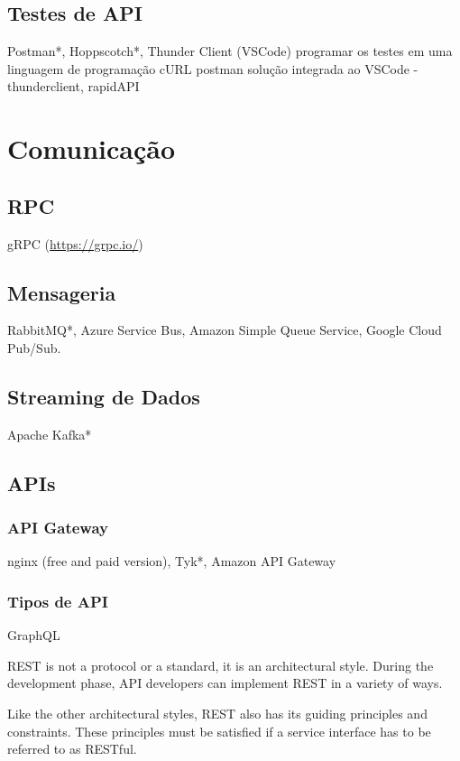\subsection{Testes de API}\label{ferramentas-testes-apis}
Postman*, Hoppscotch*, Thunder Client (VSCode)
programar os testes em uma linguagem de programação
cURL
postman
solução integrada ao VSCode - thunderclient, rapidAPI


\section{Comunicação}

\subsection{RPC}
gRPC (\url{https://grpc.io/})

\subsection{Mensageria}
RabbitMQ*, Azure Service Bus, Amazon Simple Queue Service, Google Cloud Pub/Sub.

\subsection{Streaming de Dados}
Apache Kafka*

\subsection{APIs}

\subsubsection{API Gateway}
nginx (free and paid version), Tyk*, Amazon API Gateway

\subsubsection{Tipos de API}

GraphQL 

REST is not a protocol or a standard, it is an architectural style. During the development phase, API developers can implement REST in a variety of ways.

Like the other architectural styles, REST also has its guiding principles and constraints. These principles must be satisfied if a service interface has to be referred to as RESTful.

